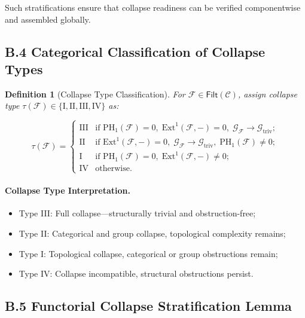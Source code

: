 \documentclass[11pt]{article}
\newtheorem{definition}[theorem]{Definition}
\begin{document}
Such stratifications ensure that collapse readiness can be verified componentwise and assembled globally.

\subsection*{B.4 Categorical Classification of Collapse Types}

\begin{definition}[Collapse Type Classification]
For \( \mathcal{F} \in \mathsf{Filt}(\mathcal{C}) \), assign collapse type \( \tau(\mathcal{F}) \in \{\mathrm{I}, \mathrm{II}, \mathrm{III}, \mathrm{IV}\} \) as:

\[
\tau(\mathcal{F}) =
\begin{cases}
\mathrm{III} & \text{if } \mathrm{PH}_1(\mathcal{F}) = 0, \; \mathrm{Ext}^1(\mathcal{F}, -) = 0, \; \mathcal{G}_{\mathcal{F}} \longrightarrow \mathcal{G}_{\mathrm{triv}}; \\
\mathrm{II}  & \text{if } \mathrm{Ext}^1(\mathcal{F}, -) = 0, \; \mathcal{G}_{\mathcal{F}} \longrightarrow \mathcal{G}_{\mathrm{triv}}, \; \mathrm{PH}_1(\mathcal{F}) \neq 0; \\
\mathrm{I}   & \text{if } \mathrm{PH}_1(\mathcal{F}) = 0, \; \mathrm{Ext}^1(\mathcal{F}, -) \neq 0; \\
\mathrm{IV}  & \text{otherwise}.
\end{cases}
\]
\end{definition}

\paragraph{Collapse Type Interpretation.}

\begin{itemize}
    \item Type III: Full collapse—structurally trivial and obstruction-free;
    \item Type II: Categorical and group collapse, topological complexity remains;
    \item Type I: Topological collapse, categorical or group obstructions remain;
    \item Type IV: Collapse incompatible, structural obstructions persist.
\end{itemize}

\subsection*{B.5 Functorial Collapse Stratification Lemma}
\end{document}
